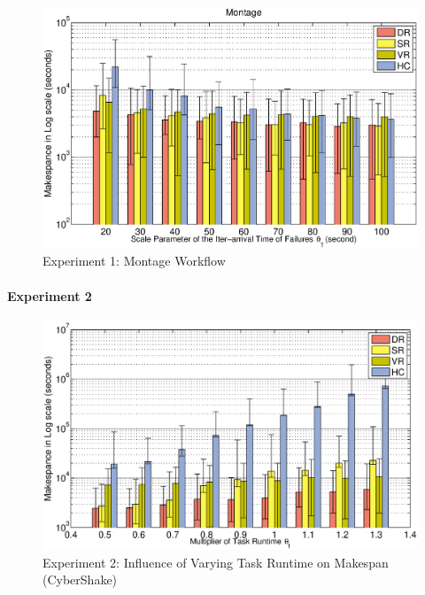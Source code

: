 \documentclass{IOS-Book-Article}
\begin{document}



\begin{figure}[!htb]
\centering
  \includegraphics[width=1\linewidth]{montage.eps}
  \caption{Experiment 1: Montage Workflow}
  \label{fig:expr_montage}
\end{figure}

\paragraph{\textbf{Experiment 2}}

\begin{figure}[!htb]
\centering
  \includegraphics[width=1\linewidth]{t.eps}
  \caption{Experiment 2:  Influence of Varying Task Runtime on Makespan (CyberShake)}
  \label{fig:expr_t}
\end{figure}
\end{document}
